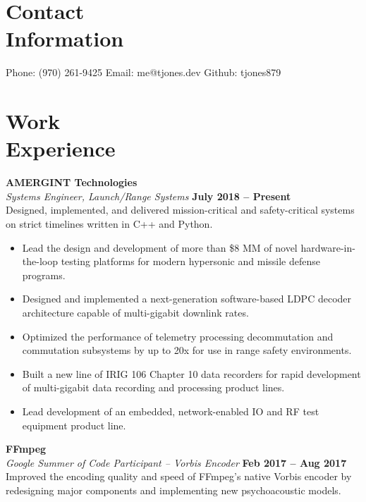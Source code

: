 \documentclass[margin,line]{resume}
\begin{document}
\begin{resume}
    \section{\mysidestyle Contact\\Information}

    Phone: (970) 261-9425 \hfill Email: me@tjones.dev  \hfill Github: tjones879\vspace{0mm}\\\vspace{-4.5mm}

    \section{\mysidestyle Work\\Experience}

    \textbf{AMERGINT Technologies} \vspace{1mm}\\\vspace{1mm}%
    \textsl{Systems Engineer, Launch/Range Systems} \hfill \textbf{July 2018 -- Present}\\
      Designed, implemented, and delivered mission-critical and safety-critical systems on strict timelines
      written in C++ and Python.
      \begin{itemize}
      \item Lead the design and development of more than \$8 MM of novel hardware-in-the-loop testing platforms
            for modern hypersonic and missile defense programs.
      \item Designed and implemented a next-generation software-based LDPC decoder architecture capable of
            multi-gigabit downlink rates.
      \item Optimized the performance of telemetry processing decommutation and commutation subsystems
            by up to 20x for use in range safety environments.
      \item Built a new line of IRIG 106 Chapter 10 data recorders for rapid development of
            multi-gigabit data recording and processing product lines.
      \item Lead development of an embedded, network-enabled IO and RF test equipment product line.
      \end{itemize}


    \textbf{FFmpeg} \vspace{1mm}\\\vspace{1mm}%
    \textsl{Google Summer of Code Participant -- Vorbis Encoder} \hfill \textbf{Feb 2017 -- Aug 2017}\\
    Improved the encoding quality and speed of FFmpeg's native Vorbis
    encoder by redesigning major components and implementing new
    psychoacoustic models.


\end{resume}
\end{document}
